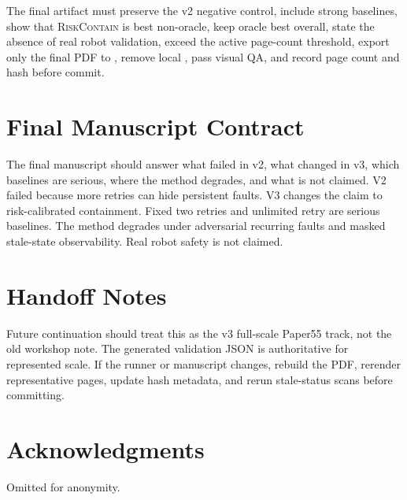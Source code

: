 \documentclass{article}
\newcommand{\method}{\textsc{RiskContain}\xspace}
\begin{document}
The final artifact must preserve the v2 negative control, include strong baselines, show that \method is best non-oracle, keep oracle best overall, state the absence of real robot validation, exceed the active page-count threshold, export only the final PDF to , remove local , pass visual QA, and record page count and hash before commit.

\section{Final Manuscript Contract}

The final manuscript should answer what failed in v2, what changed in v3, which baselines are serious, where the method degrades, and what is not claimed. V2 failed because more retries can hide persistent faults. V3 changes the claim to risk-calibrated containment. Fixed two retries and unlimited retry are serious baselines. The method degrades under adversarial recurring faults and masked stale-state observability. Real robot safety is not claimed.

\section{Handoff Notes}

Future continuation should treat this as the v3 full-scale Paper55 track, not the old workshop note. The generated validation JSON is authoritative for represented scale. If the runner or manuscript changes, rebuild the PDF, rerender representative pages, update hash metadata, and rerun stale-status scans before committing.



\section*{Acknowledgments}
Omitted for anonymity.



\end{document}
